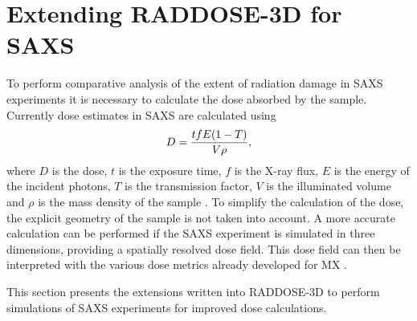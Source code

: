 \section{Extending RADDOSE-3D for SAXS}
\label{sec:Extending RADDOSE-3D for SAXS}
To perform comparative analysis of the extent of radiation damage in SAXS experiments it is necessary to calculate the dose absorbed by the sample.
Currently dose estimates in SAXS are calculated using
\begin{equation}
    D = \frac{tfE(1-T)}{V\rho},
\end{equation}
where $D$ is the dose, $t$ is the exposure time, $f$ is the X-ray flux, $E$ is the energy of the incident photons, $T$ is the transmission factor, $V$ is the illuminated volume and $\rho$ is the mass density of the sample \cite{meisburger2013breaking,jeffries2015limiting}.
To simplify the calculation of the dose, the explicit geometry of the sample is not taken into account.
A more accurate calculation can be performed if the SAXS experiment is simulated in three dimensions, providing a spatially resolved dose field.
This dose field can then be interpreted with the various dose metrics already developed for MX \cite{zeldin2013dwd,zeldin2012}.

This section presents the extensions written into RADDOSE-3D to perform simulations of SAXS experiments for improved dose calculations.

